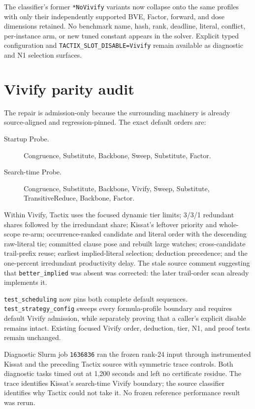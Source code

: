 \documentclass[11pt]{article}
\newcommand{\code}[1]{\texttt{#1}}
\begin{document}
The classifier's former \code{*NoVivify} variants now collapse onto the same
profiles with only their independently supported BVE, Factor, forward, and
dose dimensions retained.  No benchmark name, hash, rank, deadline, literal,
conflict, per-instance arm, or new tuned constant appears in the solver.
Explicit typed configuration and \code{TACTIX\_SLOT\_DISABLE=Vivify} remain
available as diagnostic and N1 selection surfaces.

\section*{Vivify parity audit}
The repair is admission-only because the surrounding machinery is already
source-aligned and regression-pinned.  The exact default orders are:

\begin{description}
\item[Startup Probe.] Congruence, Substitute, Backbone, Sweep, Substitute,
Factor.
\item[Search-time Probe.] Congruence, Substitute, Backbone, Vivify, Sweep,
Substitute, TransitiveReduce, Backbone, Factor.
\end{description}

Within Vivify, Tactix uses the focused dynamic tier limits; 3/3/1 redundant
shares followed by the irredundant share; Kissat's leftover priority and
whole-scope re-arm; occurrence-ranked candidate and literal order with the
descending raw-literal tie; committed clause pose and rebuilt large watches;
cross-candidate trail-prefix reuse; earliest implied-literal selection;
deduction precedence; and the one-percent irredundant productivity delay.
The stale source comment suggesting that \code{better\_implied} was absent
was corrected: the later trail-order scan already implements it.

\code{test\_scheduling} now pins both complete default sequences.
\code{test\_strategy\_config} sweeps every formula-profile boundary and
requires default Vivify admission, while separately proving that a caller's
explicit disable remains intact.  Existing focused Vivify order, deduction,
tier, N1, and proof tests remain unchanged.

Diagnostic Slurm job \code{1636836} ran the frozen rank-24 input through
instrumented Kissat and the preceding Tactix source with symmetric trace
controls.  Both diagnostic tasks timed out at 1,200 seconds and left no
certificate residue.  The trace identifies Kissat's search-time Vivify
boundary; the source classifier identifies why Tactix could not take it.  No
frozen reference performance result was rerun.
\end{document}
